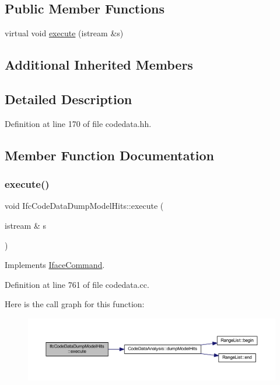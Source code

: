 \subsection*{Public Member Functions}
\begin{DoxyCompactItemize}
\item 
virtual void \mbox{\hyperlink{class_ifc_code_data_dump_model_hits_a370a70077aa312c0ddb4f4e35cee5301}{execute}} (istream \&s)
\end{DoxyCompactItemize}
\subsection*{Additional Inherited Members}


\subsection{Detailed Description}


Definition at line 170 of file codedata.\+hh.



\subsection{Member Function Documentation}
\mbox{\label{class_ifc_code_data_dump_model_hits_a370a70077aa312c0ddb4f4e35cee5301}} 
\subsubsection{\texorpdfstring{execute()}{execute()}}
{\footnotesize\ttfamily void Ifc\+Code\+Data\+Dump\+Model\+Hits\+::execute (\begin{DoxyParamCaption}\item[{istream \&}]{s }\end{DoxyParamCaption})\hspace{0.3cm}{\ttfamily [virtual]}}



Implements \mbox{\hyperlink{class_iface_command_af10e29cee2c8e419de6efe9e680ad201}{Iface\+Command}}.



Definition at line 761 of file codedata.\+cc.

Here is the call graph for this function\+:
\nopagebreak
\begin{figure}[H]
\begin{center}
\leavevmode
\includegraphics[width=350pt]{class_ifc_code_data_dump_model_hits_a370a70077aa312c0ddb4f4e35cee5301_cgraph}
\end{center}
\end{figure}


